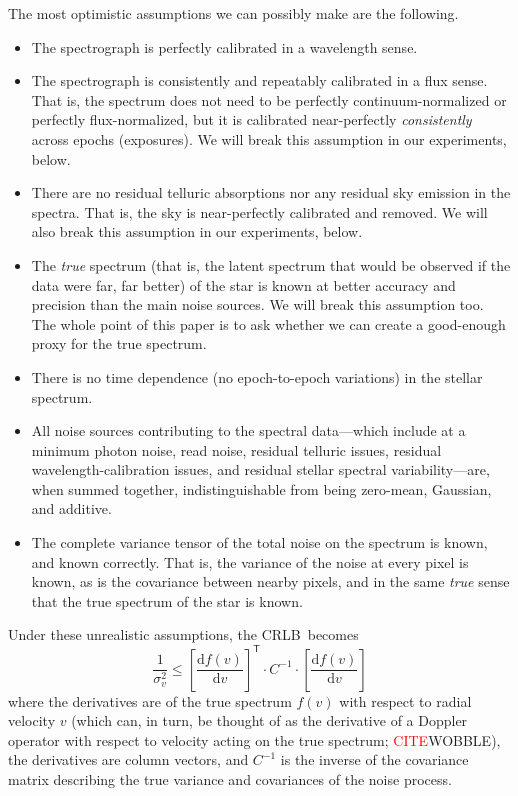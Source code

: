 \documentclass[modern]{aastex63}
\newcommand{\dd}{\mathrm{d}}
\newcommand{\T}{^{\mathsf{T}}}
\newcommand{\todo}[1]{\textcolor{red}{#1}}  %
\newcommand{\CITE}{\todo{CITE}}
\newcommand{\acronym}[1]{{\small{#1}}}
\newcommand{\CRLB}{\acronym{CRLB}}
\begin{document}
The most optimistic assumptions we can possibly make are the following.
\begin{itemize}
\item The spectrograph is perfectly calibrated in a wavelength sense.
\item The spectrograph is consistently and repeatably calibrated in a
  flux sense. That is, the spectrum does not need to be perfectly
  continuum-normalized or perfectly flux-normalized, but it is
  calibrated near-perfectly \emph{consistently} across epochs (exposures).
  We will break this assumption in our experiments, below.
\item There are no residual telluric absorptions nor any residual sky
  emission in the spectra. That is, the sky is near-perfectly calibrated
  and removed.
  We will also break this assumption in our experiments, below.
\item The \emph{true} spectrum (that is, the latent spectrum that
  would be observed if the data were far, far better) of the star is
  known at better accuracy and precision than the main noise sources.
  We will break this assumption too.
  The whole point of this paper is to ask whether we can create a
  good-enough proxy for the true spectrum.
\item There is no time dependence (no epoch-to-epoch variations) in the
  stellar spectrum.
\item All noise sources contributing to the spectral data---which
  include at a minimum photon noise, read noise, residual telluric
  issues, residual wavelength-calibration issues, and residual stellar
  spectral variability---are, when summed together, indistinguishable
  from being zero-mean, Gaussian, and additive.
\item The complete variance tensor of the total noise on the spectrum is known, and
  known correctly. That is, the variance of the noise at every pixel
  is known, as is the covariance between nearby pixels, and in the
  same \emph{true} sense that the true spectrum of the star is known.
\end{itemize}
Under these unrealistic assumptions, the \CRLB\ becomes
\begin{equation}\label{eq:crlb}
\frac{1}{\sigma_v^2} \leq \left[\frac{\dd f(v)}{\dd v}\right]\T\cdot C^{-1}\cdot\left[\frac{\dd f(v)}{\dd v}\right]
\end{equation}
where the derivatives are of the true spectrum $f(v)$ with respect to
radial velocity $v$ (which can, in turn, be thought of as the derivative of a Doppler
operator with respect to velocity acting on the true spectrum; \CITE WOBBLE), the
derivatives are column vectors, and $C^{-1}$ is the inverse of the covariance matrix
describing the true variance and covariances of the noise process.
\end{document}
